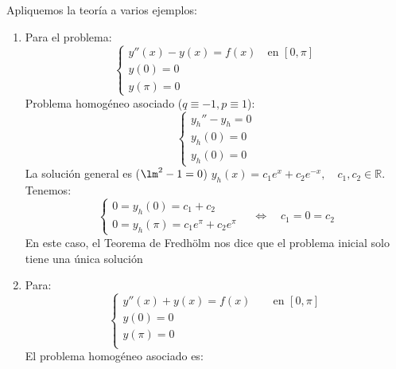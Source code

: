 \begin{ejemplo}
    Apliquemos la teoría a varios ejemplos:
    \begin{enumerate}
        \item Para el problema:
        \begin{equation*}
            \left\{\begin{array}{l}
                y''(x) - y(x) = f(x) \quad \text{en\ } [0,\pi] \\
                y(0) = 0 \\
                y(\pi) = 0 
            \end{array}\right.
        \end{equation*}
        Problema homogéneo asociado ($q\equiv-1, p\equiv1$):
        \begin{equation*}
            \left\{\begin{array}{l}
                    y_h'' - y_h = 0 \\
                    y_h(0) = 0 \\
                    y_h(0) = 0 
            \end{array}\right.
        \end{equation*}
        La solución general es ($\lm^2-1=0$) $y_h(x) = c_1e^x + c_2 e^{-x},\quad  c_1,c_2\in \mathbb{R}$. Tenemos:
        \begin{equation*}
            \left\{\begin{array}{l}
                0 = y_h(0) = c_1 + c_2  \\
                0 = y_h(\pi) = c_1e^\pi + c_2 e^\pi
            \end{array}\right. \quad\Longleftrightarrow\quad c_1 = 0 = c_2
        \end{equation*}
        En este caso, el Teorema de Fredhölm nos dice que el problema inicial solo tiene una única solución
    \item Para:
        \begin{equation*}
            \left\{\begin{array}{l}
                y''(x) + y(x) = f(x)\qquad \text{en\ } [0,\pi] \\
                y(0) = 0 \\
                y(\pi) = 0 \\
            \end{array}\right.
        \end{equation*}
        El problema homogéneo asociado es:
        \begin{equation*}

\end{equation*}
\end{enumerate}
\end{ejemplo}
